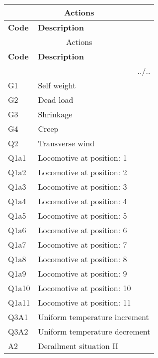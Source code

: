 \begin{center}
\begin{small}
\begin{longtable}{|l|p{10cm}|}
\hline
\multicolumn{2}{|c|}{Actions}\\
\hline
\textbf{Code} & \textbf{Description} \\
\hline
\endfirsthead
\hline
\multicolumn{2}{|c|}{Actions}\\
\hline
\textbf{Code} & \textbf{Description} \\
\hline
\endhead
\hline \multicolumn{2}{|r|}{{../..}} \\ \hline
\endfoot
\hline
\endlastfoot
G1 & Self weight\\
G2 & Dead load\\
G3 & Shrinkage\\
G4 & Creep\\
Q2 & Transverse wind\\
Q1a1 & Locomotive at position: 1\\
Q1a2 & Locomotive at position: 2\\
Q1a3 & Locomotive at position: 3\\
Q1a4 & Locomotive at position: 4\\
Q1a5 & Locomotive at position: 5\\
Q1a6 & Locomotive at position: 6\\
Q1a7 & Locomotive at position: 7\\
Q1a8 & Locomotive at position: 8\\
Q1a9 & Locomotive at position: 9\\
Q1a10 & Locomotive at position: 10\\
Q1a11 & Locomotive at position: 11\\
Q3A1 & Uniform temperature increment\\
Q3A2 & Uniform temperature decrement\\
A2 & Derailment situation II\\
\hline
\end{longtable}
\end{small}
\end{center}
